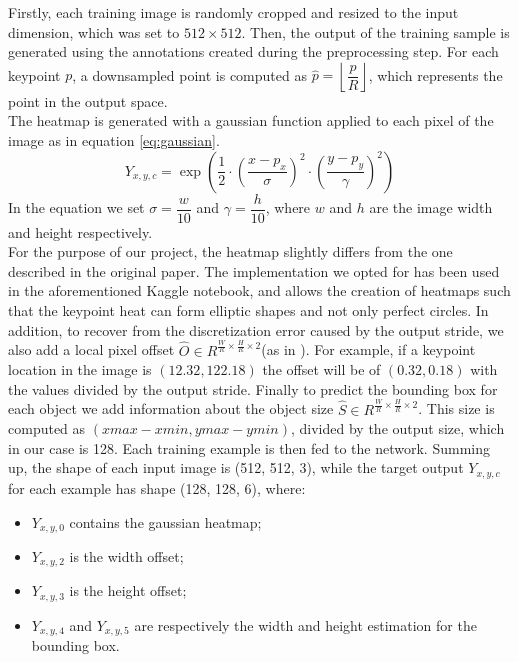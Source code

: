 \label{ssssec:inputsamples}

Firstly, each training image is randomly cropped and resized to the input dimension, which was set to $512 \times 512$. Then, the output of the training sample is generated using the annotations created during the preprocessing step. For each keypoint $p$, a downsampled point is computed as $\hat{p}=\left\lfloor \dfrac{p}{R} \right\rfloor$, which represents the point in the output space.\\
The heatmap is generated with a gaussian function applied to each pixel of the image as in equation \ref{eq:gaussian}.
\begin{equation}\label{eq:gaussian}
	Y_{x,y,c}=\exp\left(\dfrac{1}{2} \cdot \left(\frac{x-p_x}{\sigma}\right)^2 \cdot \left(\frac{y-p_y}{\gamma}\right)^2 \right)
\end{equation}
In the equation we set $\sigma = \dfrac{w}{10}$ and $\gamma = \dfrac{h}{10}$, where $w$ and $h$ are the image width and height respectively.\\
For the purpose of our project, the heatmap slightly differs from the one described in the original paper. The implementation we opted for has been used in the aforementioned Kaggle notebook, and allows the creation of heatmaps such that the keypoint heat can form elliptic shapes and not only perfect circles. In addition, to recover from the discretization error caused by the output stride, we also add a local pixel offset $\hat{O} \in R^{\frac{W}{R} \times \frac{H}{R} \times 2}$(as in \cite{CenterNet2019}). For example, if a keypoint location in the image is $(12.32, 122.18)$ the offset will be of $(0.32, 0.18)$ with the values divided by the output stride.
Finally to predict the bounding box for each object we add information about the object size $\hat{S} \in R^{\frac{W}{R} \times \frac{H}{R} \times 2}$. This size is computed as $(xmax-xmin, ymax-ymin)$, divided by the output size, which in our case is 128. Each training example is then fed to the network. Summing up, the shape of each input image is (512, 512, 3), while the target output $Y_{x,y,c}$ for each example has shape (128, 128, 6), where:

\begin{itemize}
	\item $Y_{x,y,0}$ contains the gaussian heatmap;
	\item $Y_{x,y,2}$ is the width offset;
	\item $Y_{x,y,3}$ is the height offset;
	\item $Y_{x,y,4}$ and $Y_{x,y,5}$ are respectively the width and height estimation for the bounding box.
\end{itemize}

